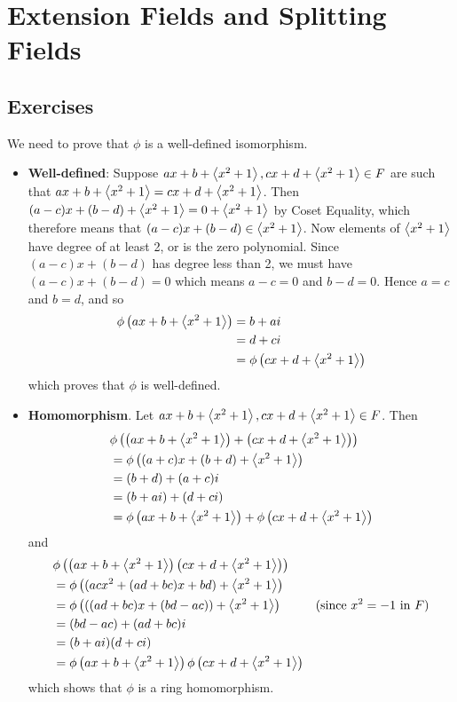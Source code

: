\section{Extension Fields and Splitting Fields}
\subsection*{Exercises}
\begin{questions}
    \item We need to prove that $\phi$ is a well-defined isomorphism.
    \begin{itemize}
        \item \textbf{Well-defined}: Suppose $ax + b + \left\langle x^2+1\right\rangle, cx + d + \left\langle x^2+1\right\rangle \in F$ are such that $ax + b + \left\langle x^2+1\right\rangle = cx + d + \left\langle x^2+1\right\rangle$. Then $(a - c)x + (b - d) + \left\langle x^2 + 1\right\rangle = 0 + \left\langle x^2+1\right\rangle$ by Coset Equality, which therefore means that $(a-c)x + (b-d) \in \left\langle x^2+1\right\rangle$. Now elements of $\left\langle x^2+1\right\rangle$ have degree of at least 2, or is the zero polynomial. Since $(a-c)x + (b-d)$ has degree less than 2, we must have $(a-c)x + (b-d) = 0$ which means $a - c = 0$ and $b - d = 0$. Hence $a = c$ and $b = d$, and so
        \begin{align*}
            \phi\left(ax + b + \left\langle x^2+1\right\rangle\right) &= b + ai\\
            &= d + ci\\
            &= \phi\left(cx + d + \left\langle x^2+1\right\rangle\right)
        \end{align*}
        which proves that $\phi$ is well-defined.

        \item \textbf{Homomorphism}. Let $ax + b + \left\langle x^2+1\right\rangle, cx + d + \left\langle x^2+1\right\rangle \in F$. Then
        \begin{align*}
            &\phi\left(\left(ax + b + \left\langle x^2+1\right\rangle\right) + \left(cx + d + \left\langle x^2+1\right\rangle\right)\right)\\
            &= \phi\left((a+c)x + (b+d) + \left\langle x^2+1\right\rangle\right)\\
            &= (b+d) + (a+c)i\\
            &= (b+ai) + (d+ci)\\
            &= \phi\left(ax + b + \left\langle x^2+1\right\rangle\right) + \phi\left(cx + d + \left\langle x^2+1\right\rangle\right)
        \end{align*}
        and
        \begin{align*}
            &\phi\left(\left(ax + b + \left\langle x^2+1\right\rangle\right)\left(cx + d + \left\langle x^2+1\right\rangle\right)\right)\\
            &= \phi\left((acx^2 + (ad + bc)x + bd) + \left\langle x^2+1\right\rangle\right)\\
            &= \phi\left(((ad + bc)x + (bd - ac)) + \left\langle x^2+1\right\rangle\right) & (\text{since } x^2 = -1 \text{ in } F)\\
            &= (bd - ac) + (ad + bc)i\\
            &= (b + ai)(d + ci)\\
            &= \phi\left(ax + b + \left\langle x^2+1\right\rangle\right)\phi\left(cx + d + \left\langle x^2+1\right\rangle\right)
        \end{align*}
        which shows that $\phi$ is a ring homomorphism.


\end{itemize}
\end{questions}
